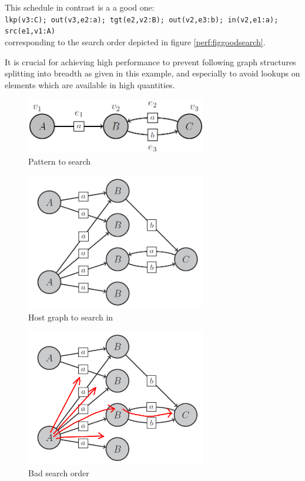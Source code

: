 This schedule in contrast is a a good one:\\
\texttt{lkp(v3:C); out(v3,e2:a); tgt(e2,v2:B); out(v2,e3:b); in(v2,e1:a); src(e1,v1:A)}\\
corresponding to the search order depicted in figure \ref{perf:figgoodsearch}.

It is crucial for achieving high performance to prevent following graph structures splitting into breadth as given in this example, and especially to avoid lookups on elements which are available in high quantities.

\begin{figure}[p]
  \centering
  \includegraphics[width=0.7\textwidth]{fig/Pattern}
  \caption{Pattern to search}
  \label{perf:figpatterntosearch}
\end{figure}

\begin{figure}[p]
  \centering
  \includegraphics[width=0.7\textwidth]{fig/Graph}
  \caption{Host graph to search in}
  \label{perf:figgraphtosearchin}
\end{figure}

\pagebreak

\begin{figure}[p]
  \centering
  \includegraphics[width=0.7\textwidth]{fig/GraphBad}
  \caption{Bad search order}
  \label{perf:figbadsearch}
\end{figure}

